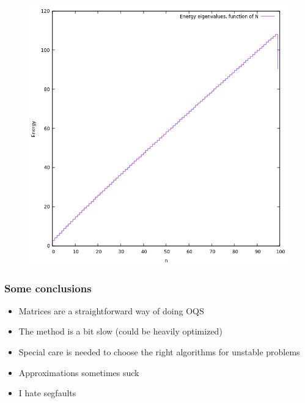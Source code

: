 \documentclass{beamer}
\begin{document}
\begin{frame}
\begin{figure}
\includegraphics[scale=0.55]{wqc.png}
\end{figure}
\end{frame}
\begin{frame}
\frametitle{Some conclusions}
\begin{itemize}
\item Matrices are a straightforward way of doing OQS
\item The method is a bit slow (could be heavily optimized)
\item Special care is needed to choose the right algorithms for unstable problems
\item Approximations sometimes suck
\item I hate segfaults
\end{itemize}
\end{frame}
\end{document}
